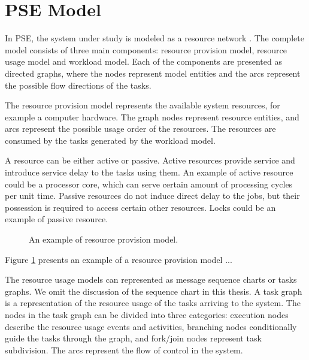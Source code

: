
\section{PSE Model}

In PSE, the system under study is modeled as a resource network \cite{Menasce:1994:CPP:174466}. The complete model consists of three main components: resource provision model, resource usage model and workload model. Each of the components are presented as directed graphs, where the nodes represent model entities and the arcs represent the possible flow directions of the tasks.

The resource provision model represents the available system resources, for example a computer hardware. The graph nodes represent resource entities, and arcs represent the possible usage order of the resources. The resources are consumed by the tasks generated by the workload model.

A resource can be either active or passive. Active resources provide service and introduce service delay to the tasks using them. An example of active resource could be a processor core, which can serve certain amount of processing cycles per unit time. Passive resources do not induce direct delay to the jobs, but their possession is required to access certain other resources. Locks  could be an example of passive resource.

\begin{figure}[h!]
  \begin{center}
    \caption{An example of resource provision model.}
    \label{fig:resource-provision-model}
  \end{center}

\end{figure}

Figure \ref{fig:resource-provision-model} presents an example of a resource provision model ...

The resource usage models can represented as message sequence charts or tasks graphs. We omit the discussion of the sequence chart in this thesis. A task graph is a representation of the resource usage of the tasks arriving to the system. The nodes in the task graph can be divided into three categories: execution nodes describe the resource usage events and activities, branching nodes conditionally guide the tasks through the graph, and fork/join nodes represent task subdivision. The arcs represent the flow of control in the system.

